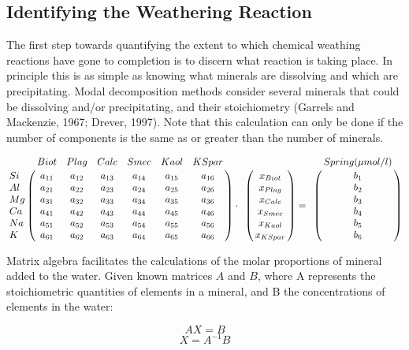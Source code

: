 \subsection{Identifying the Weathering Reaction}

The first step towards quantifying the extent to which chemical weathing reactions have gone to completion is to discern what reaction is taking place. In principle this is as simple as knowing what minerals are dissolving and which are precipitating. Modal decomposition methods consider several minerals that could be dissolving and/or precipitating, and their stoichiometry (Garrels and Mackenzie, 1967; Drever, 1997). Note that this calculation can only be done if the number of components is the same as or greater than the number of minerals.


\begin{center}
\[
  \begin{bordermatrix}
{ & Biot & Plag & Calc & Smec & Kaol & KSpar \cr
Si  & a_{11}  & a_{12}  & a_{13}  & a_{14}  & a_{15}  & a_{16}  \cr
Al  & a_{21}  & a_{22}  & a_{23}  & a_{24}  & a_{25}  & a_{26}  \cr
Mg  & a_{31}  & a_{32}  & a_{33}  & a_{34}  & a_{35}  & a_{36}  \cr
Ca  & a_{41}  & a_{42}  & a_{43}  & a_{44}  & a_{45}  & a_{46}  \cr
Na  & a_{51}  & a_{52}  & a_{53}  & a_{54}  & a_{55}  & a_{56}  \cr
K   & a_{61}  & a_{62}  & a_{63}  & a_{64}  & a_{65}  & a_{66}  \cr}
  \end{bordermatrix}
  \cdot
  \begin{bordermatrix}
{ &  \cr
  & x_{Biot} \cr
  & x_{Plag} \cr
  & x_{Calc} \cr
  & x_{Smec} \cr
  & x_{Kaol} \cr
  & x_{KSpar} \cr}
  \end{bordermatrix}
  =
  \begin{bordermatrix}
{ & Spring (\mu mol/l) \cr
  & b_1 \cr
  & b_2 \cr
  & b_3 \cr
  & b_4 \cr
  & b_5 \cr
  & b_6 \cr}
  \end{bordermatrix}
\]
\end{center}
\bsk

Matrix algebra facilitates the calculations of the molar proportions of mineral added to the water. Given known matrices \( A \) and \( B \), where A represents the stoichiometric quantities of elements in a mineral, and B the concentrations of elements in the water:

\begin{equation}
AX = B
\end{equation}
\begin{equation}
X = A^{-1}B
\end{equation}\\

